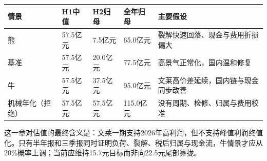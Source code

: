 \begin{exhibitbox}[H1到H2的正常化桥]
\noindent\begin{tabularx}{\textwidth}{L{2.2cm}R{2.0cm}R{2.0cm}R{2.0cm}X}
\toprule
\textbf{情景} & \textbf{H1中值} & \textbf{H2归母} & \textbf{全年归母} & \textbf{主要假设} \\
\midrule
熊 & 57.5亿元 & 7.5亿元 & 65.0亿元 & 裂解快速回落、现金与费用折损偏大 \\
基准 & 57.5亿元 & 20.0亿元 & 77.5亿元 & 高景气正常化，国内温和修复 \\
牛 & 57.5亿元 & 37.5亿元 & 95.0亿元 & 文莱高价差延续，国内链与现金同步改善 \\
机械年化（拒绝） & 57.5亿元 & 57.5亿元 & 115.0亿元 & 没有周期、检修、归属与费用校准 \\
\bottomrule
\end{tabularx}
\end{exhibitbox}

这一章对估值的最终含义是：文莱一期支持2026年高利润，但不支持峰值利润终值化。只有半年报和三季报同时证明负荷、裂解、税后归属与现金流，牛情景才应从20\%概率上调；当前应维持15.7元目标而非向22.5元尾部靠拢。
